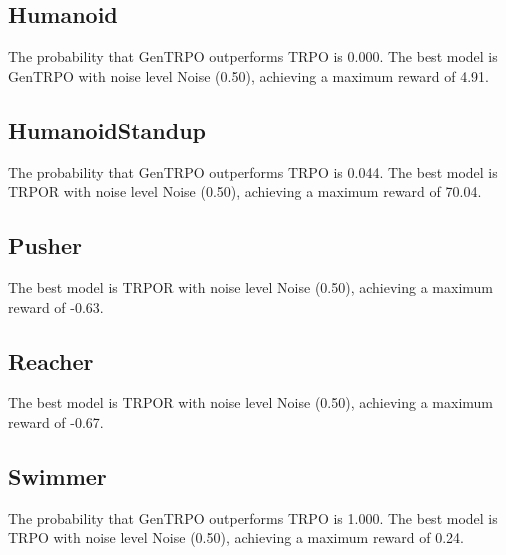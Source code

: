 \subsection{Humanoid}
The probability that GenTRPO outperforms TRPO is 0.000.
The best model is GenTRPO with noise level Noise (0.50), achieving a maximum reward of 4.91.
\subsection{HumanoidStandup}
The probability that GenTRPO outperforms TRPO is 0.044.
The best model is TRPOR with noise level Noise (0.50), achieving a maximum reward of 70.04.
\subsection{Pusher}
The best model is TRPOR with noise level Noise (0.50), achieving a maximum reward of -0.63.
\subsection{Reacher}
The best model is TRPOR with noise level Noise (0.50), achieving a maximum reward of -0.67.
\subsection{Swimmer}
The probability that GenTRPO outperforms TRPO is 1.000.
The best model is TRPO with noise level Noise (0.50), achieving a maximum reward of 0.24.